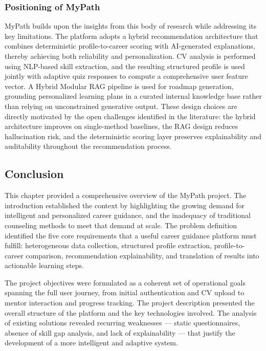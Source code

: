 \documentclass[12pt,a4paper]{article}
\begin{document}
\subsubsection*{Positioning of MyPath}

MyPath builds upon the insights from this body of research while addressing its key limitations. The platform adopts a hybrid recommendation architecture that combines deterministic profile-to-career scoring with AI-generated explanations, thereby achieving both reliability and personalization. CV analysis is performed using NLP-based skill extraction, and the resulting structured profile is used jointly with adaptive quiz responses to compute a comprehensive user feature vector. A Hybrid Modular RAG pipeline is used for roadmap generation, grounding personalized learning plans in a curated internal knowledge base rather than relying on unconstrained generative output. These design choices are directly motivated by the open challenges identified in the literature: the hybrid architecture improves on single-method baselines, the RAG design reduces hallucination risk, and the deterministic scoring layer preserves explainability and auditability throughout the recommendation process.

\subsection{Conclusion}

This chapter provided a comprehensive overview of the MyPath project. The introduction established the context by highlighting the growing demand for intelligent and personalized career guidance, and the inadequacy of traditional counseling methods to meet that demand at scale. The problem definition identified the five core requirements that a useful career guidance platform must fulfill: heterogeneous data collection, structured profile extraction, profile-to-career comparison, recommendation explainability, and translation of results into actionable learning steps.

The project objectives were formulated as a coherent set of operational goals spanning the full user journey, from initial authentication and CV upload to mentor interaction and progress tracking. The project description presented the overall structure of the platform and the key technologies involved. The analysis of existing solutions revealed recurring weaknesses — static questionnaires, absence of skill gap analysis, and lack of explainability — that justify the development of a more intelligent and adaptive system.
\end{document}
